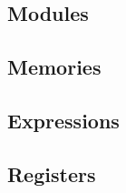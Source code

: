\subsection{Modules}
\label{hls:modules}

\subsection{Memories}
\label{hls:memories}

\subsection{Expressions}
\label{hls:expressions}

\subsection{Registers}
\label{hls:registers}

